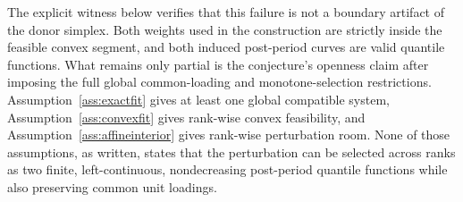 The explicit witness below verifies that this failure is not a boundary artifact of the donor simplex.  Both weights used in the construction are strictly inside the feasible convex segment, and both induced post-period curves are valid quantile functions.  What remains only partial is the conjecture's openness claim after imposing the full global common-loading and monotone-selection restrictions.  Assumption~\ref{ass:exactfit} gives at least one global compatible system, Assumption~\ref{ass:convexfit} gives rank-wise convex feasibility, and Assumption~\ref{ass:affineinterior} gives rank-wise perturbation room.  None of those assumptions, as written, states that the perturbation can be selected across ranks as two finite, left-continuous, nondecreasing post-period quantile functions while also preserving common unit loadings.

